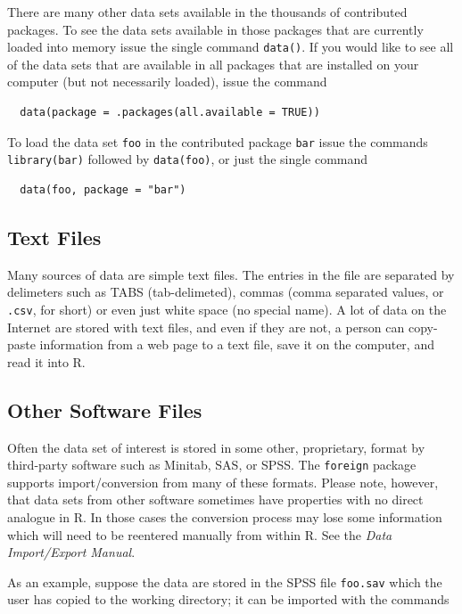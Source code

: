\documentclass[captions=tableheading]{scrbook}
\begin{document}
There are many other data sets available in the thousands of contributed packages. To see the data sets available in those packages that are currently loaded into memory issue the single command \texttt{data()}. If you would like to see all of the data sets that are available in all packages that are installed on your computer (but not necessarily loaded), issue the command 

\begin{verbatim}
  data(package = .packages(all.available = TRUE))
\end{verbatim}

To load the data set \texttt{foo} in the contributed package \texttt{bar} issue the commands \texttt{library(bar)} followed by \texttt{data(foo)}, or just the single command  

\begin{verbatim}
  data(foo, package = "bar")
\end{verbatim}
\subsection{Text Files}
\label{sec-20-2-2}

Many sources of data are simple text files. The entries in the file are separated by delimeters such as TABS (tab-delimeted), commas (comma separated values, or \texttt{.csv}, for short) or even just white space (no special name). A lot of data on the Internet are stored with text files, and even if they are not, a person can copy-paste information from a web page to a text file, save it on the computer, and read it into \textsf{R}. 
\subsection{Other Software Files}
\label{sec-20-2-3}

Often the data set of interest is stored in some other, proprietary, format by third-party software such as Minitab, SAS, or SPSS. The \texttt{foreign} package supports import/conversion from many of these formats. Please note, however, that data sets from other software sometimes have properties with no direct analogue in \textsf{R}. In those cases the conversion process may lose some information which will need to be reentered manually from within \textsf{R}. See the \emph{Data Import/Export Manual}.

As an example, suppose the data are stored in the SPSS file \texttt{foo.sav} which the user has copied to the working directory; it can be imported with the commands
\end{document}
